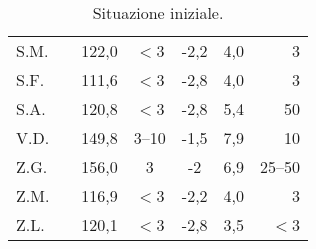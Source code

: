 \begin{table}[!h]
\begin{center}
\begin{tabular}{lcccccr}
S.M.	& \checkmark 	  				& 122,0 & $<$3  & -2,2 & 4,0 & 3      \\
S.F.	&  				  		& 111,6 & $<$3  & -2,8 & 4,0 & 3      \\
S.A.	&  				  		& 120,8 & $<$3  & -2,8 & 5,4 & 50     \\
V.D.	&  				  		& 149,8 & 3--10 & -1,5 & 7,9 & 10     \\
Z.G.	&  				  		& 156,0 & 3     & -2   & 6,9 & 25--50  \\
Z.M.	&  				  		& 116,9 & $<$3  & -2,2 & 4,0 & 3      \\
Z.L.	&  				  		& 120,1 & $<$3  & -2,8 & 3,5 & $<$3   \\
\bottomrule
\end{tabular}
\end{center}
\caption{Situazione iniziale.}
\label{tab:SituazioneIniziale}
\end{table}


